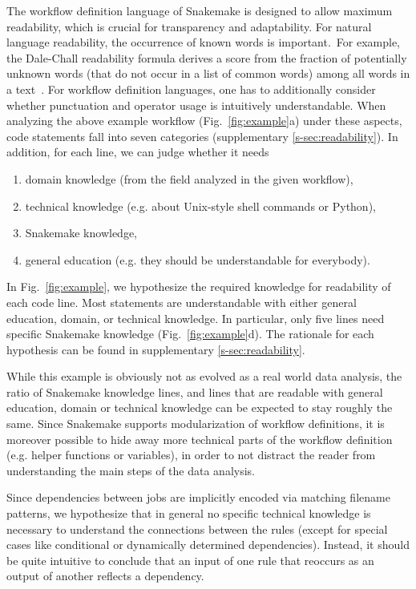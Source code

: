\documentclass[parskip=half]{scrartcl}
\begin{document}
The workflow definition language of Snakemake is designed to allow maximum readability, which is crucial for transparency and adaptability.
For natural language readability, the occurrence of known words is important.~For example, the Dale-Chall readability formula derives a score from the fraction of potentially unknown words (that do not occur in a list of common words) among all words in a text~\parencite{chall_readability_1995}.
For workflow definition languages, one has to additionally consider whether punctuation and operator usage is intuitively understandable.
When analyzing the above example workflow (Fig.~\ref{fig:example}a) under these aspects, code statements fall into seven categories (supplementary \autoref{s-sec:readability}).
In addition, for each line, we can judge whether it needs

\begin{enumerate}
	\item domain knowledge (from the field analyzed in the given workflow),
	\item technical knowledge (e.g. about Unix-style shell commands or Python),
	\item Snakemake knowledge,
	\item general education (e.g. they should be understandable for everybody).
\end{enumerate}

In Fig.~{\ref{fig:example}}, we hypothesize the required knowledge for readability of each code line.
Most statements are understandable with either general education, domain, or technical knowledge.
In particular, only five lines need specific Snakemake knowledge (Fig.~{\ref{fig:example}}d).
The rationale for each hypothesis can be found in supplementary \autoref{s-sec:readability}.

While this example is obviously not as evolved as a real world data analysis, the ratio of Snakemake knowledge lines, and lines that are readable with general education, domain or technical knowledge can be expected to stay roughly the same.
Since Snakemake supports modularization of workflow definitions, it is moreover possible to hide away more technical parts of the workflow definition (e.g. helper functions or variables), in order to not distract the reader from understanding the main steps of the data analysis.

Since dependencies between jobs are implicitly encoded via matching filename patterns, we hypothesize that in general no specific technical knowledge is necessary to understand the connections between the rules (except for special cases like conditional or dynamically determined dependencies).
Instead, it should be quite intuitive to conclude that an input of one rule that reoccurs as an output of another reflects a dependency.
\end{document}

